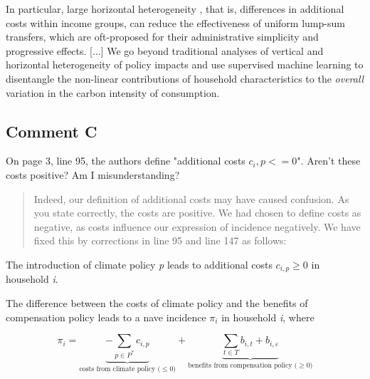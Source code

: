 \documentclass[11pt]{article}
\newenvironment{response}
{\begin{quote}\color{black}}
{\end{quote}}
\begin{document}
\begin{revisionbox}
    In particular, large horizontal heterogeneity \autocite{Fischer.2019,Hansel.2022}, that is, differences in additional costs within income groups, can reduce the effectiveness of uniform lump-sum transfers, which are oft-proposed for their administrative simplicity and progressive effects. [...] We go beyond traditional analyses of vertical and horizontal heterogeneity of policy impacts and use supervised machine learning to disentangle the non-linear contributions of household characteristics to the \textit{overall} variation in the carbon intensity of consumption.
\end{revisionbox}

\subsection*{Comment C}\label{comment_R1_C}

\begin{commentbox}
    On page 3, line 95, the authors define "additional costs $c_i,p <= 0$". Aren't these costs positive? Am I misunderstanding?
\end{commentbox}

\begin{response}
    Indeed, our definition of additional costs may have caused confusion. As you state correctly, the costs are positive. We had chosen to define costs as negative, as costs influence our expression of incidence negatively. We have fixed this by corrections in line 95 and line 147 as follows:
\end{response}
\begin{revisionbox}
    The introduction of climate policy \textit{p} leads to additional costs $c_{i,p}\geq 0$ in household \textit{i}.
\end{revisionbox}

\begin{revisionbox}
The difference between the costs of climate policy and the benefits of compensation policy leads to a nave incidence $\pi_{i}$ in household \textit{i}, where

\begin{equation} \label{eq:pi}
    \pi_{i} = \underbrace{-\sum_{p\in P^{\ast}} c_{i,p}}_{\text{costs from climate policy ($\leq 0$)}} + \underbrace{\sum_{t\in T} b_{i,t} + b_{i,\varepsilon}}_{\text{benefits from compensation policy ($\geq 0$)}}
\end{equation}
\end{revisionbox}
\end{document}
